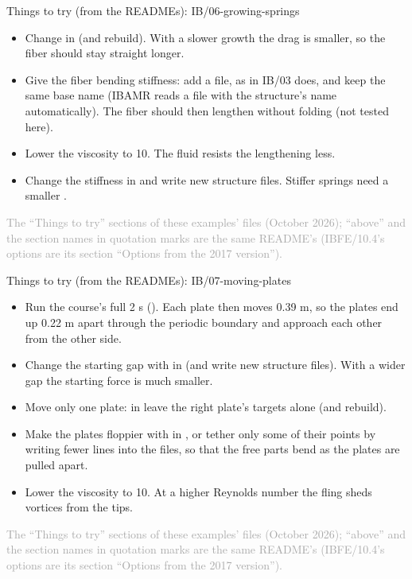 \documentclass[aspectratio=169,11pt]{beamer}
\newcommand{\sourcecredit}[1]{\vfill\begin{flushright}\tiny\textcolor{DarkGray}{#1}\end{flushright}}
\begin{document}
\begin{frame}{Things to try (from the READMEs): IB/06-growing-springs}
\scriptsize\setlength{\leftmargini}{5em}
\begin{itemize}\setlength{\itemsep}{1pt}
  \item[IB/06.1] Change  in  (and rebuild). With a slower growth the drag is smaller, so the fiber should stay straight longer.
  \item[IB/06.2] Give the fiber bending stiffness: add a  file, as  in IB/03 does, and keep the same base name (IBAMR reads a  file with the structure's name automatically). The fiber should then lengthen without folding (not tested here).
  \item[IB/06.3] Lower the viscosity  to 10. The fluid resists the lengthening less.
  \item[IB/06.4] Change the stiffness  in  and write new structure files. Stiffer springs need a smaller .
\end{itemize}
\sourcecredit{The ``Things to try'' sections of these examples' \code{README.md} files (October 2026); ``above'' and the section names in quotation marks are the same README's (IBFE/10.4's options are its section ``Options from the 2017 version'').}
\end{frame}

\begin{frame}{Things to try (from the READMEs): IB/07-moving-plates}
\scriptsize\setlength{\leftmargini}{5em}
\begin{itemize}\setlength{\itemsep}{1pt}
  \item[IB/07.1] Run the course's full 2 s (). Each plate then moves 0.39 m, so the plates end up 0.22 m apart through the periodic boundary and approach each other from the other side.
  \item[IB/07.2] Change the starting gap with  in  (and write new structure files). With a wider gap the starting force is much smaller.
  \item[IB/07.3] Move only one plate: in  leave the right plate's targets alone (and rebuild).
  \item[IB/07.4] Make the plates floppier with  in , or tether only some of their points by writing fewer lines into the  files, so that the free parts bend as the plates are pulled apart.
  \item[IB/07.5] Lower the viscosity  to 10. At a higher Reynolds number the fling sheds vortices from the tips.
\end{itemize}
\sourcecredit{The ``Things to try'' sections of these examples' \code{README.md} files (October 2026); ``above'' and the section names in quotation marks are the same README's (IBFE/10.4's options are its section ``Options from the 2017 version'').}
\end{frame}
\end{document}
